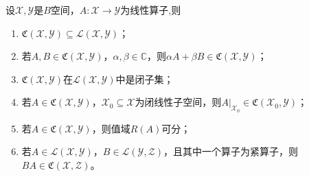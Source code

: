 \documentclass[../../main.tex]{subfiles}%
\begin{document}
\begin{proposition}\label{proposition:泛函分析--命题3.1.2}
设$\mathscr{X},\mathscr{Y}$是$B$空间，$A:\mathscr{X}\to\mathscr{Y}$为线性算子,则
\begin{enumerate}[(1)]
\item $\mathfrak{C}(\mathscr{X},\mathscr{Y})\subseteq\mathscr{L}(\mathscr{X},\mathscr{Y})$；

\item 若$A,B\in\mathfrak{C}(\mathscr{X},\mathscr{Y})$，$\alpha,\beta\in\mathbb{C}$，则$\alpha A+\beta B\in\mathfrak{C}(\mathscr{X},\mathscr{Y})$；

\item\label{proposition:泛函分析--命题3.1.2-3} $\mathfrak{C}(\mathscr{X},\mathscr{Y})$在$\mathscr{L}(\mathscr{X},\mathscr{Y})$中是闭子集；

\item\label{proposition:泛函分析--命题3.1.2-4} 若$A\in\mathfrak{C}(\mathscr{X},\mathscr{Y})$，$\mathscr{X}_0\subseteq\mathscr{X}$为闭线性子空间，则$A|_{\mathscr{X}_0}\in\mathfrak{C}(\mathscr{X}_0,\mathscr{Y})$；

\item 若$A\in\mathfrak{C}(\mathscr{X},\mathscr{Y})$，则值域$R(A)$可分；

\item 若$A\in\mathscr{L}(\mathscr{X},\mathscr{Y})$，$B\in\mathscr{L}(\mathscr{Y},\mathscr{Z})$，且其中一个算子为紧算子，则$BA\in\mathfrak{C}(\mathscr{X},\mathscr{Z})$。
\end{enumerate}
\end{proposition}
\end{document}
